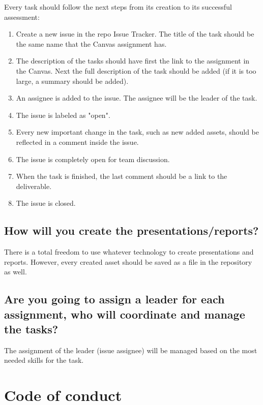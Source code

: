 \documentclass{article}
\begin{document}
Every task should follow the next steps from its creation to its successful assessment:

\begin{enumerate}
    \item Create a new issue in the repo Issue Tracker. The title of the task should be the same name that the Canvas assignment has.
    \item The description of the tasks should have first the link to the assignment in the Canvas. Next the full description of the task should be added (if it is too large, a summary should be added).
    \item An assignee is added to the issue. The assignee will be the leader of the task.
    \item The issue is labeled as "open".
    \item Every new important change in the task, such as new added assets, should be reflected in a comment inside the issue. 
    \item The issue is completely open for team discussion.
    \item When the task is finished, the last comment should be a link to the deliverable.
    \item The issue is closed.
\end{enumerate}

    

\subsection{How will you create the presentations/reports?}

There is a total freedom to use whatever technology to create presentations and reports. However, every created asset should be saved as a file in the repository as well.


\subsection{Are you going to assign a leader for each assignment, who will coordinate and manage the tasks?}

The assignment of the leader (issue assignee) will be managed based on the most needed skills for the task.

\section{Code of conduct}



%
\end{document}
